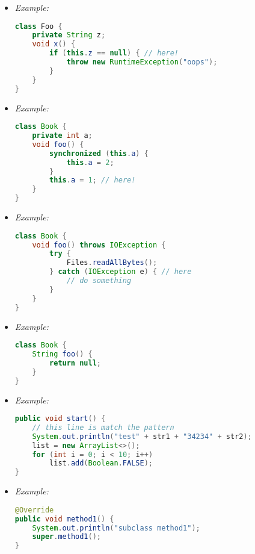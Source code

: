 \begin{itemize}
	\item {}
{\it Example:}
\begin{lstlisting}[language=Java]
class Foo {
	private String z;
	void x() {
		if (this.z == null) { // here!
			throw new RuntimeException("oops");
		}
	}
}
\end{lstlisting}

	\item {}
{\it Example:}
\begin{lstlisting}[language=Java]
class Book {
	private int a;
	void foo() {
		synchronized (this.a) {
			this.a = 2;
		}
		this.a = 1; // here!
	}
}
\end{lstlisting}

	\item {}
{\it Example:}
\begin{lstlisting}[language=Java]
class Book {
	void foo() throws IOException {
		try {
			Files.readAllBytes();
		} catch (IOException e) { // here
			// do something
		}
	}
}
\end{lstlisting}

	\item {}
{\it Example:}
\begin{lstlisting}[language=Java]
class Book {
	String foo() {
		return null;
	}
}
\end{lstlisting}

	\item {}
{\it Example:}
\begin{lstlisting}[language=Java]
public void start() {
	// this line is match the pattern
	System.out.println("test" + str1 + "34234" + str2);
	list = new ArrayList<>();
	for (int i = 0; i < 10; i++)
		list.add(Boolean.FALSE);
}
\end{lstlisting}

	\item {}
{\it Example:}
\begin{lstlisting}[language=Java]
@Override
public void method1() {
	System.out.println("subclass method1");
	super.method1();
}
\end{lstlisting}


\end{itemize}

